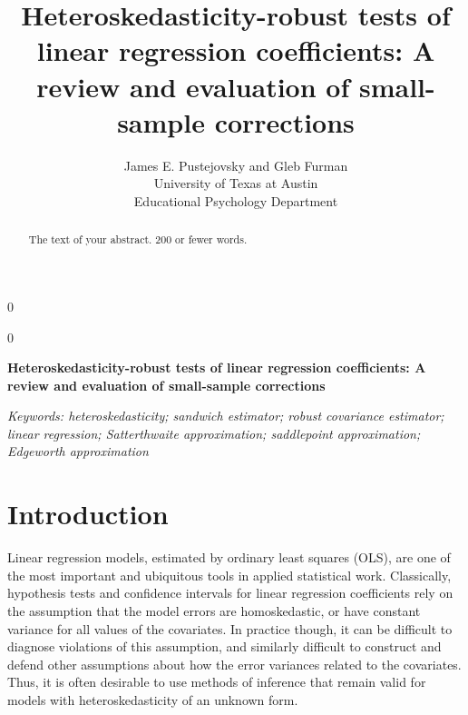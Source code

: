 \documentclass[12pt]{article}\usepackage[]{graphicx}\usepackage[]{color}
\newcommand{\blind}{0}
\newcommand{\MyTitle}{Heteroskedasticity-robust tests of linear regression coefficients: A review and evaluation of small-sample corrections}
\begin{document}
%

\def\spacingset#1{\renewcommand{\baselinestretch}%
{#1}\small\normalsize} \spacingset{1}



\blind
{
  \title{\bf \MyTitle}
  \author{James E. Pustejovsky and Gleb Furman \\
    University of Texas at Austin \\
    Educational Psychology Department}
  \maketitle
} \fi

\blind
{
  \bigskip
  \bigskip
  \bigskip
  \begin{center}
    {\LARGE\bf \MyTitle}
\end{center}
  \medskip
} \fi

\bigskip
\begin{abstract}
The text of your abstract.  200 or fewer words.
\end{abstract}

\noindent%
{\it Keywords: heteroskedasticity; sandwich estimator; robust covariance estimator; linear regression; Satterthwaite approximation; saddlepoint approximation; Edgeworth approximation} 
\vfill

\newpage
\spacingset{1.45} %

\section{Introduction}
\label{sec:intro}

Linear regression models, estimated by ordinary least squares (OLS), are one of the most important and ubiquitous tools in applied statistical work.
Classically, hypothesis tests and confidence intervals for linear regression coefficients rely on the assumption that the model errors are homoskedastic, or have constant variance for all values of the covariates. 
In practice though, it can be difficult to diagnose violations of this assumption, and similarly difficult to construct and defend other assumptions about how the error variances related to the covariates. 
Thus, it is often desirable to use methods of inference that remain valid for models with heteroskedasticity of an unknown form. 
\end{document}
